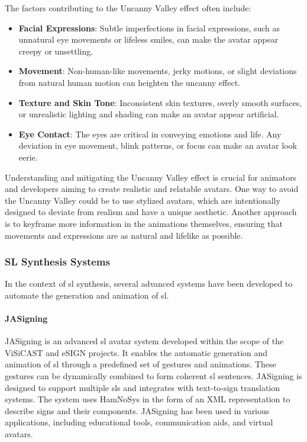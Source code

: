 \documentclass[../../main.tex]{subfiles}
\begin{document}
The factors contributing to the Uncanny Valley effect often include:

\begin{itemize}
  \item \textbf{Facial Expressions}: Subtle imperfections in facial expressions, such as unnatural eye movements or lifeless smiles, can make the avatar appear creepy or unsettling.
  \item \textbf{Movement}: Non-human-like movements, jerky motions, or slight deviations from natural human motion can heighten the uncanny effect.
  \item \textbf{Texture and Skin Tone}: Inconsistent skin textures, overly smooth surfaces, or unrealistic lighting and shading can make an avatar appear artificial.
  \item \textbf{Eye Contact}: The eyes are critical in conveying emotions and life. Any deviation in eye movement, blink patterns, or focus can make an avatar look eerie.
\end{itemize}

Understanding and mitigating the Uncanny Valley effect is crucial for animators and developers aiming to create realistic and relatable avatars. One way to avoid the Uncanny Valley could be to use stylized avatars, which are intentionally designed to deviate from realism and have a unique aesthetic. Another approach is to keyframe more information in the animations themselves, ensuring that movements and expressions are as natural and lifelike as possible.

\subsubsection{SL Synthesis Systems}
\label{ch:background_work:sign_language_synthesis:3d_techniques:sign_language_synthesis_systems}

In the context of \gls{sl} synthesis, several advanced systems have been developed to automate the generation and animation of \gls{sl}.

\paragraph{JASigning}
\label{ch:background_work:sign_language_synthesis:3d_techniques:sign_language_synthesis_systems:jasigning}

JASigning is an advanced \gls{sl} avatar system developed within the scope of the ViSiCAST and eSIGN projects. It enables the automatic generation and animation of \gls{sl} through a predefined set of gestures and animations. These gestures can be dynamically combined to form coherent \gls{sl} sentences. JASigning is designed to support multiple \gls{sl}s and integrates with text-to-sign translation systems. The system uses HamNoSys in the form of an XML representation to describe signs and their components. JASigning has been used in various applications, including educational tools, communication aids, and virtual avatars.
\end{document}
